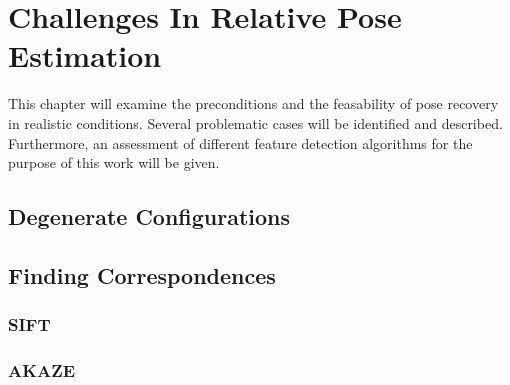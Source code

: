 \chapter{Challenges In Relative Pose Estimation}

This chapter will examine the preconditions and the feasability of pose recovery
in realistic conditions. Several problematic cases will be identified and
described. Furthermore, an assessment of different feature detection algorithms
for the purpose of this work will be given.

\section{Degenerate Configurations}



\section{Finding Correspondences}

\subsection{SIFT}

\subsection{AKAZE}


